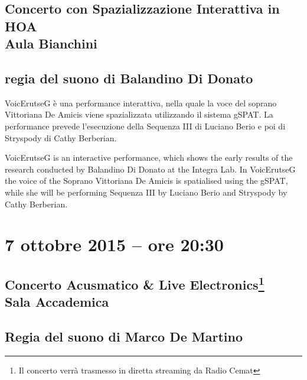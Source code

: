 \documentclass[8pt, twoside, a5paper]{extreport}
\begin{document}
\subsection*{{\small Concerto con Spazializzazione Interattiva in HOA} \\
	\textsf{Aula Bianchini}}

{\fontsize{30}{30} }

\subsection*{\textsf{regia del suono di Balandino Di Donato}}

\bigskip

VoicErutseG è una performance interattiva, nella quale la voce del soprano Vittoriana De Amicis viene spazializzata utilizzando il sistema gSPAT. La performance prevede l’esecuzione della Sequenza III di Luciano Berio e poi di Stryspody di Cathy Berberian.

VoicErutseG is an interactive performance, which shows the early results of the research conducted by Balandino Di Donato at the Integra Lab.
In VoicErutseG the voice of the Soprano Vittoriana De Amicis is spatialised using the gSPAT, while she will be performing Sequenza III by Luciano Berio and Stryspody by Cathy Berberian.

\begin{multicols}{2}




\end{multicols}

\clearpage

\section*{7 ottobre 2015 -- ore 20:30}

\subsection*{{\small Concerto Acusmatico \& Live Electronics\footnote{ Il concerto verrà trasmesso in diretta streaming da Radio Cemat}} \\
	\textsf{Sala Accademica}}

{\fontsize{30}{30} }

\subsection*{\textsf{Regia del suono di Marco De Martino}}
\end{document}
